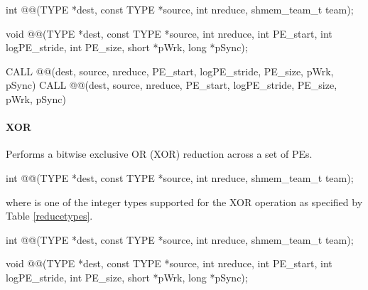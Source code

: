 \begin{apidefinition}
\begin{Csynopsis}
\end{Csynopsis}
{\color{Green}
\begin{CsynopsisCol}
int @@(TYPE *dest, const TYPE *source, int nreduce, shmem_team_t team);
\end{CsynopsisCol}
}
\begin{DeprecateBlock}
\begin{CsynopsisCol}
void @@(TYPE *dest, const TYPE *source, int nreduce, int PE_start, int logPE_stride, int PE_size, short *pWrk, long *pSync);
\end{CsynopsisCol}
\end{DeprecateBlock}

\begin{Fsynopsis}
CALL @@(dest, source, nreduce, PE_start, logPE_stride, PE_size, pWrk, pSync)
CALL @@(dest, source, nreduce, PE_start, logPE_stride, PE_size, pWrk, pSync)
\end{Fsynopsis}

\paragraph{XOR}
Performs a bitwise exclusive OR (XOR) reduction across a set of \acp{PE}.\newline

{\color{Green}
\begin{C11synopsis}
int @@(TYPE *dest, const TYPE *source, int nreduce, shmem_team_t team);
\end{C11synopsis}
where \TYPE{} is one of the integer types supported for the XOR operation as specified by Table \ref{reducetypes}.
}

\begin{Csynopsis}
\end{Csynopsis}
{\color{Green}
\begin{CsynopsisCol}
int @@(TYPE *dest, const TYPE *source, int nreduce, shmem_team_t team);
\end{CsynopsisCol}
}
\begin{DeprecateBlock}
\begin{CsynopsisCol}
void @@(TYPE *dest, const TYPE *source, int nreduce, int PE_start, int logPE_stride, int PE_size, short *pWrk, long *pSync);
\end{CsynopsisCol}
\end{DeprecateBlock}


\end{apidefinition}
